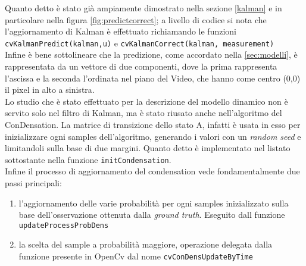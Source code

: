 Quanto detto è stato già ampiamente dimostrato nella sezione \ref{kalman} e in particolare nella figura \ref{fig:predictcorrect}; a livello di codice si nota che l'aggiornamento di Kalman è effettuato richiamando le funzioni \texttt{cvKalmanPredict(kalman,u)} e  \texttt{cvKalmanCorrect(kalman, measurement)}\\
Infine è bene sottolineare che la predizione, come accordato nella \ref{sec:modelli}, è rappresentata da un vettore di due componenti, dove la prima rappresenta l'ascissa e la seconda l'ordinata nel piano del Video, che hanno come centro (0,0) il pixel in alto a sinistra.\\
\newpage
Lo studio che è stato effettuato per la descrizione del modello dinamico non è servito solo nel filtro di Kalman, ma è stato riusato anche nell'algoritmo del ConDensation. La matrice di transizione dello stato A, infatti è usata in esso per inizializzare ogni samples dell'algoritmo, generando i valori con un \textit{random seed} e limitandoli sulla base di due margini. Quanto detto è implementato nel listato sottostante nella funzione \texttt{initCondensation}.\\
Infine il processo di aggiornamento del condensation vede fondamentalmente due passi principali:
\begin{enumerate}
 \item l'aggiornamento delle varie probabilità per ogni samples inizializzato sulla base dell'osservazione ottenuta dalla \textit{ground truth}. Eseguito dall funzione \texttt{updateProcessProbDens}
\item  la scelta del sample a probabilità maggiore, operazione delegata dalla funzione presente in OpenCv dal nome \texttt{cvConDensUpdateByTime}
\end{enumerate}




